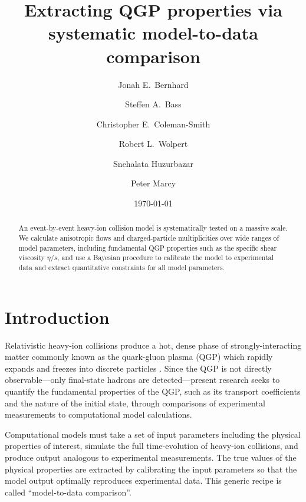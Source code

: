 \documentclass[aps,prc,reprint,amsmath]{revtex4-1}
\begin{document}
\title{Extracting QGP properties via systematic model-to-data comparison}

\author{Jonah E.\ Bernhard}
\author{Steffen A.\ Bass}
\author{Christopher E.\ Coleman-Smith}
\author{Robert L.\ Wolpert}

\author{Snehalata Huzurbazar}

\author{Peter Marcy}


\date{\today}

\begin{abstract}
  An event-by-event heavy-ion collision model is systematically tested on a massive scale.
  We calculate anisotropic flows and charged-particle multiplicities over wide ranges of model parameters, including fundamental QGP properties such as the specific shear viscosity $\eta/s$, and use a Bayesian procedure to calibrate the model to experimental data and extract quantitative constraints for all model parameters.
\end{abstract}

\maketitle


\section{Introduction}

Relativistic heavy-ion collisions produce a hot, dense phase of strongly-interacting matter commonly known as the quark-gluon plasma (QGP) which rapidly expands and freezes into discrete particles \cite{}.
Since the QGP is not directly observable---only final-state hadrons are detected---present research seeks to quantify the fundamental properties of the QGP, such as its transport coefficients and the nature of the initial state, through comparisons of experimental measurements to computational model calculations.

Computational models must take a set of input parameters including the physical properties of interest, simulate the full time-evolution of heavy-ion collisions, and produce output analogous to experimental measurements.
The true values of the physical properties are extracted by calibrating the input parameters so that the model output optimally reproduces experimental data.
This generic recipe is called ``model-to-data comparison''.
\end{document}

